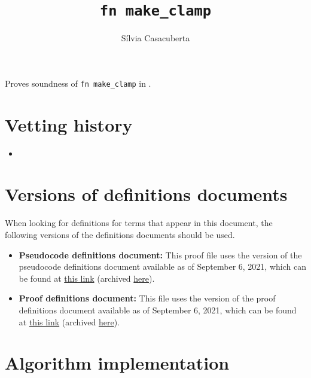 \documentclass{article}
\title{\texttt{fn make\_clamp}}
\author{S\'ilvia Casacuberta}
\date{}
\begin{document}
\maketitle

\contrib
Proves soundness of \texttt{fn make\_clamp} in .

\section{Vetting history}
\begin{itemize}
    \item {}
\end{itemize}

\section{Versions of definitions documents}
\label{sec:versioned-docs}

When looking for definitions for terms that appear in this document, the following versions of the definitions documents should be used.

\begin{itemize}
    \item \textbf{Pseudocode definitions document:} This proof file uses the version of the pseudocode definitions document available as of September 6, 2021, which can be found at \href{https://github.com/opendp/whitepapers/blob/f8b279ab249934182f306138fa14e6390ddae3e9/pseudocode-defns/pseudocode_defns.pdf}{this link} (archived \href{https://web.archive.org/web/20210906201546/https://raw.githubusercontent.com/opendp/whitepapers/pseudocode-defns/pseudocode-defns/pseudocode_defns.pdf}{here}).
    
    \item \textbf{Proof definitions document:} This file uses the version of the proof definitions document available as of September 6, 2021, which can be found at \href{https://github.com/opendp/whitepapers/blob/d4c24e55cc37878634fec0b7f5c89259a3ad3ded/proof-defns/proof_defns.pdf}{this link} (archived \href{https://web.archive.org/web/20210906201056/https://raw.githubusercontent.com/opendp/whitepapers/proof-defns/proof-defns/proof_defns.pdf}{here}). 
\end{itemize}

\section{Algorithm implementation}
\end{document}
